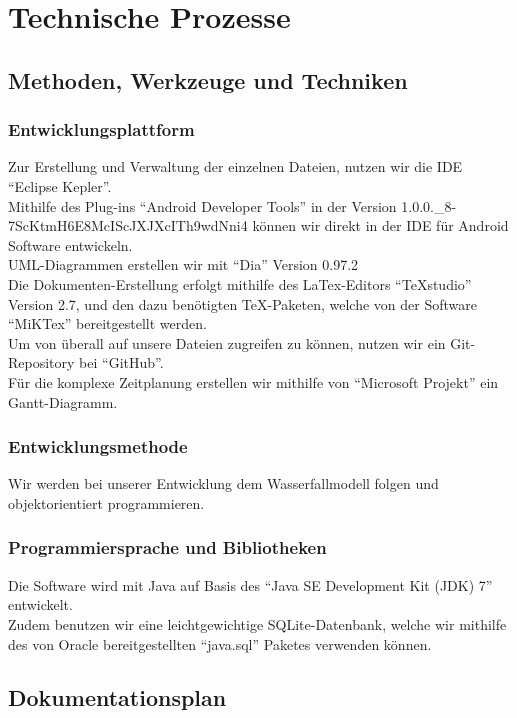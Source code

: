 \section{Technische Prozesse}
\subsection{Methoden, Werkzeuge und Techniken}
\subsubsection{Entwicklungsplattform}
Zur Erstellung und Verwaltung der einzelnen Dateien, nutzen wir die IDE "`Eclipse Kepler"'. \\
Mithilfe des Plug-ins "`Android Developer Tools"' in der Version 1.0.0.\_8-7ScKtmH6E8McIScJXJXcITh9wdNni4 können wir direkt in der IDE für Android Software entwickeln. \\
UML-Diagrammen erstellen wir mit "`Dia"' Version 0.97.2 \\
Die Dokumenten-Erstellung erfolgt mithilfe des LaTex-Editors "`TeXstudio"' Version 2.7, und den dazu benötigten TeX-Paketen, welche von der Software "`MiKTex"' bereitgestellt werden. \\
Um von überall auf unsere Dateien zugreifen zu können, nutzen wir ein Git-Repository bei "`GitHub"'. \\
Für die komplexe Zeitplanung erstellen wir mithilfe von "`Microsoft Projekt"' ein Gantt-Diagramm. 

\subsubsection{Entwicklungsmethode}

Wir werden bei unserer Entwicklung dem Wasserfallmodell folgen und objektorientiert programmieren. 

\subsubsection{Programmiersprache und Bibliotheken}

Die Software wird mit Java auf Basis des "`Java SE Development Kit (JDK) 7"' entwickelt.\\
Zudem benutzen wir eine leichtgewichtige SQLite-Datenbank, welche wir mithilfe des von Oracle bereitgestellten "`java.sql"' Paketes verwenden können.\\

\subsection{Dokumentationsplan}

